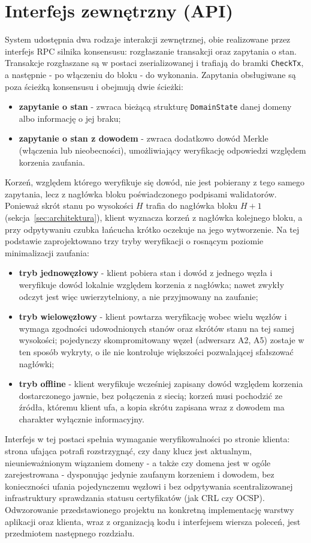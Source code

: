 \section{Interfejs zewnętrzny (API)}
\label{sec:api}

System udostępnia dwa rodzaje interakcji zewnętrznej, obie realizowane przez interfejs RPC silnika konsensusu: rozgłaszanie transakcji oraz zapytania o stan. Transakcje rozgłaszane są w postaci zserializowanej i trafiają do bramki \texttt{CheckTx}, a następnie - po włączeniu do bloku - do wykonania. Zapytania obsługiwane są poza ścieżką konsensusu i obejmują dwie ścieżki:
\begin{itemize}
    \item \textbf{zapytanie o stan} - zwraca bieżącą strukturę \texttt{DomainState} danej domeny albo informację o jej braku;
    \item \textbf{zapytanie o stan z dowodem} - zwraca dodatkowo dowód Merkle (włączenia lub nieobecności), umożliwiający weryfikację odpowiedzi względem korzenia zaufania.
\end{itemize}

Korzeń, względem którego weryfikuje się dowód, nie jest pobierany z tego samego zapytania, lecz z nagłówka bloku poświadczonego podpisami walidatorów. Ponieważ skrót stanu po wysokości $H$ trafia do nagłówka bloku $H+1$ (sekcja~\ref{sec:architektura}), klient wyznacza korzeń z nagłówka kolejnego bloku, a przy odpytywaniu czubka łańcucha krótko oczekuje na jego wytworzenie. Na tej podstawie zaprojektowano trzy tryby weryfikacji o rosnącym poziomie minimalizacji zaufania:
\begin{itemize}
    \item \textbf{tryb jednowęzłowy} - klient pobiera stan i dowód z jednego węzła i weryfikuje dowód lokalnie względem korzenia z nagłówka; nawet zwykły odczyt jest więc uwierzytelniony, a nie przyjmowany na zaufanie;
    \item \textbf{tryb wielowęzłowy} - klient powtarza weryfikację wobec wielu węzłów i wymaga zgodności udowodnionych stanów oraz skrótów stanu na tej samej wysokości; pojedynczy skompromitowany węzeł (adwersarz A2, A5) zostaje w ten sposób wykryty, o ile nie kontroluje większości pozwalającej sfałszować nagłówki;
    \item \textbf{tryb offline} - klient weryfikuje wcześniej zapisany dowód względem korzenia dostarczonego jawnie, bez połączenia z siecią; korzeń musi pochodzić ze źródła, któremu klient ufa, a kopia skrótu zapisana wraz z dowodem ma charakter wyłącznie informacyjny.
\end{itemize}

Interfejs w tej postaci spełnia wymaganie weryfikowalności po stronie klienta: strona ufająca potrafi rozstrzygnąć, czy dany klucz jest aktualnym, nieunieważnionym wiązaniem domeny - a także czy domena jest w ogóle zarejestrowana - dysponując jedynie zaufanym korzeniem i dowodem, bez konieczności ufania pojedynczemu węzłowi i bez odpytywania scentralizowanej infrastruktury sprawdzania statusu certyfikatów (jak CRL czy OCSP). Odwzorowanie przedstawionego projektu na konkretną implementację warstwy aplikacji oraz klienta, wraz z organizacją kodu i interfejsem wiersza poleceń, jest przedmiotem następnego rozdziału.
